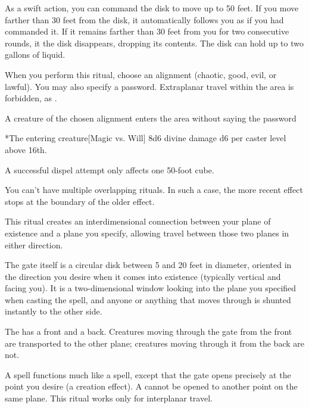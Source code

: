 As a swift action, you can command the disk to move up to 50 feet. If you move farther than 30 feet from the disk, it automatically follows you as if you had commanded it. If it remains farther than 30 feet from you for two consecutive rounds, it the disk disappears, dropping its contents.
\spellnotes The disk can hold up to two gallons of liquid.

\spellspecial When you perform this ritual, choose an alignment (chaotic, good, evil, or lawful). You may also specify a password.
\spellline
\spelleffect Extraplanar travel within the area is forbidden, as .
\begin{spelltrigger}{A creature of the chosen alignment enters the area without saying the password}
    \begin{spelltarget}*{The entering creature}[Magic vs. Will]
        \spellsuccess 8d6 divine damage \add d6 per caster level above 16th.
    \end{spelltarget}
\end{spelltrigger}
\spellnotes A successful dispel attempt only affects one 50-foot cube.
\par You can't have multiple overlapping  rituals. In such a case, the more recent effect stops at the boundary of the older effect.

\spellrng{\rngmed}
\spellline
\spelleffect This ritual creates an interdimensional connection between your plane of existence and a plane you specify, allowing travel between those two planes in either direction.
\par The gate itself is a circular disk between 5 and 20 feet in diameter, oriented in the direction you desire when it comes into existence (typically vertical and facing you). It is a two-dimensional window looking into the plane you specified when casting the spell, and anyone or anything that moves through is shunted instantly to the other side.
\par The  has a front and a back. Creatures moving through the gate from the front are transported to the other plane; creatures moving through it from the back are not.
\par A  spell functions much like a  spell, except that the gate opens precisely at the point you desire (a creation effect). 
\spellnotes A  cannot be opened to another point on the same plane. This ritual works only for interplanar travel.

